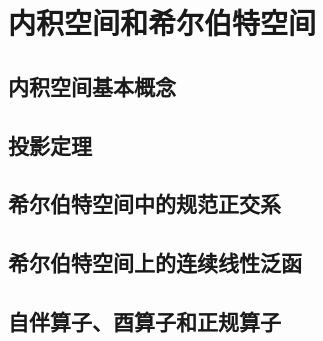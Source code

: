 \chapter{内积空间和希尔伯特空间}

\section{内积空间基本概念}\label{sec:3.1}


\section{投影定理}\label{sec:3.2}



\section{希尔伯特空间中的规范正交系}\label{sec:3.3}


\section{希尔伯特空间上的连续线性泛函}\label{sec:3.4}




\section{自伴算子、酉算子和正规算子}\label{sec:3.5}




